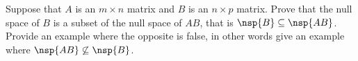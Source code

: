 Suppose that $A$ is an $m\times n$ matrix and $B$ is an $n\times p$ matrix.  Prove that the null space of $B$ is a subset of the null space of $AB$, that is $\nsp{B}\subseteq\nsp{AB}$.  Provide an example where the opposite is false, in other words give an example where $\nsp{AB}\not\subseteq\nsp{B}$. 